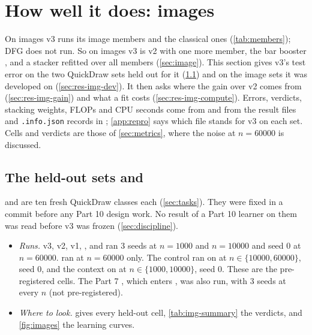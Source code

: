 \section{How well it does: images}\label{sec:results-img}

On images v3 runs its image members and the classical ones (\cref{tab:members}); DFG does not run. So on images v3 is v2 with one more member, the bar booster , and a stacker refitted over all members (\cref{sec:image}). This section gives v3's test error on the two QuickDraw sets held out for it (\cref{sec:res-img-heldout}) and on the image sets it was developed on (\cref{sec:res-img-dev}). It then asks where the gain over v2 comes from (\cref{sec:res-img-gain}) and what a fit costs (\cref{sec:res-img-compute}). Errors, verdicts, stacking weights, FLOPs and CPU seconds come from  and from the result files and \texttt{.info.json} records in ; \cref{app:repro} says which file stands for v3 on each set. Cells and verdicts are those of \cref{sec:metrics}, where the noise at $n=60000$ is discussed.

\subsection{The held-out sets  and }\label{sec:res-img-heldout}

 and  are ten fresh QuickDraw classes each (\cref{sec:tasks}). They were fixed in a commit before any Part 10 design work. No result of a Part 10 learner on them was read before v3 was frozen (\cref{sec:discipline}).
\begin{itemize}
\item \emph{Runs.} v3, v2, v1, ,  and  ran 3 seeds at $n=1000$ and $n=10000$ and seed 0 at $n=60000$.  ran at $n=60000$ only. The control  ran on  at $n\in\{10000,60000\}$, seed 0, and the context  on  at $n\in\{1000,10000\}$, seed 0. These are the pre-registered cells. The Part 7 , which enters , was also run, with 3 seeds at every $n$ (not pre-registered).
\item \emph{Where to look.}  gives every held-out cell, \cref{tab:img-summary} the verdicts, and \cref{fig:images} the learning curves.
\end{itemize}

